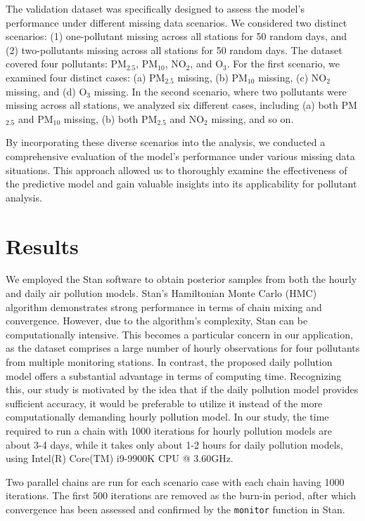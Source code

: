 \documentclass[
  12,
]{article}
\begin{document}
The validation dataset was specifically designed to assess the model's
performance under different missing data scenarios. We considered two
distinct scenarios: (1) one-pollutant missing across all stations for 50
random days, and (2) two-pollutants missing across all stations for 50
random days. The dataset covered four pollutants: PM\(_{2.5}\),
PM\(_{10}\), NO\(_2\), and O\(_3\). For the first scenario, we examined
four distinct cases: (a) PM\(_{2.5}\) missing, (b) PM\(_{10}\) missing,
(c) NO\(_2\) missing, and (d) O\(_3\) missing. In the second scenario,
where two pollutants were missing across all stations, we analyzed six
different cases, including (a) both PM\(_{2.5}\) and PM\(_{10}\)
missing, (b) both PM\(_{2.5}\) and NO\(_2\) missing, and so on.

By incorporating these diverse scenarios into the analysis, we conducted
a comprehensive evaluation of the model's performance under various
missing data situations. This approach allowed us to thoroughly examine
the effectiveness of the predictive model and gain valuable insights
into its applicability for pollutant analysis.

\hypertarget{results}{%
\section{Results}\label{results}}

We employed the Stan software \autocite{stan} to obtain posterior
samples from both the hourly and daily air pollution models. Stan's
Hamiltonian Monte Carlo (HMC) algorithm demonstrates strong performance
in terms of chain mixing and convergence. However, due to the
algorithm's complexity, Stan can be computationally intensive. This
becomes a particular concern in our application, as the dataset
comprises a large number of hourly observations for four pollutants from
multiple monitoring stations. In contrast, the proposed daily pollution
model offers a substantial advantage in terms of computing time.
Recognizing this, our study is motivated by the idea that if the daily
pollution model provides sufficient accuracy, it would be preferable to
utilize it instead of the more computationally demanding hourly
pollution model. In our study, the time required to run a chain with
1000 iterations for hourly pollution models are about 3-4 days, while it
takes only about 1-2 hours for daily pollution models, using Intel(R)
Core(TM) i9-9900K CPU @ 3.60GHz.

Two parallel chains are run for each scenario case with each chain
having 1000 iterations. The first 500 iterations are removed as the
burn-in period, after which convergence has been assessed and confirmed
by the \texttt{monitor} function in Stan.
\end{document}
